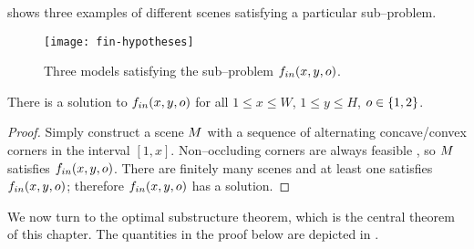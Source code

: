 shows three examples of different scenes
satisfying a particular sub--problem.

\begin{figure}[tb]
  \centering
  \texttt{[image: fin-hypotheses]}
  \caption{Three models satisfying the sub--problem
    $\SubProbIN(x,y,\WallOrient)$.}
  \label{fig:fin-examples}
\end{figure}

\begin{lemma}
  \label{lemma:solutions-exist}
  There is a solution to $\SubProbIN(x,y,\WallOrient)$ for all $1 \leq x \leq W$,
  $1 \leq y \leq H$, $\WallOrient\in\{1,2\}$.
\end{lemma}
\begin{proof}
  Simply construct a scene $\Scene$ with a sequence of alternating
  concave/convex corners in the interval $[1,x]$. Non--occluding
  corners are always feasible \cite{Lee09}, so $\Scene$ satisfies
  $\SubProbIN(x,y,\WallOrient)$. There are finitely many scenes and at
  least one satisfies $\SubProbIN(x,y,\WallOrient)$; therefore
  $\SubProbIN(x,y,\WallOrient)$ has a solution.
\end{proof}

We now turn to the optimal substructure theorem, which is the central
theorem of this chapter. The quantities in the proof below are
depicted in .

